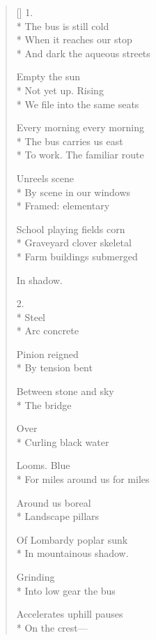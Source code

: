 \label{ch:phoenix}
\settowidth{\versewidth}{                                         There---}
\begin{verse}[\versewidth]
1.\\*
The bus is still cold\\*
When it reaches our stop\\*
And dark          the aqueous streets

Empty      the sun\\*
Not yet up.           Rising\\*
We file into the same seats

Every morning           every morning\\*
The bus carries us east\\*
To work.    The familiar route

Unreels     scene\\*
By scene     in our windows\\*
Framed: elementary

School       playing fields     corn\\*
Graveyard      clover     skeletal\\*
Farm buildings submerged

In shadow.

2.\\*
                     Steel\\*
Arc              concrete

Pinion       reigned\\*
By tension           bent

Between stone and sky\\*
The bridge

                        Over\\*
Curling black water

Looms.                     Blue\\*
For miles around us          for miles

Around us         boreal\\*
Landscape       pillars

Of Lombardy poplar           sunk\\*
In mountainous               shadow.

                               Grinding\\*
Into low gear         the bus

Accelerates        uphill             pauses\\*
On the crest---


\end{verse}
